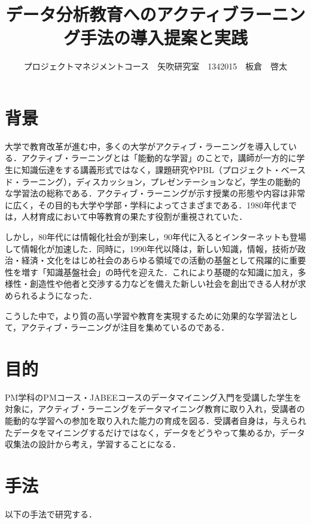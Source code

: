 \documentclass[uplatex,twocolumn,dvipdfmx]{jsarticle}
\title{\vspace{-5mm}\fontsize{14pt}{0pt}\selectfont  データ分析教育へのアクティブラーニング手法の導入提案と実践}
\author{\normalsize プロジェクトマネジメントコース　矢吹研究室　1342015　板倉　啓太}
\date{}
\begin{document}
\fontsize{10.5pt}{\baselineskip}\selectfont
\maketitle




\section{背景}

大学で教育改革が進む中，多くの大学がアクティブ・ラーニングを導入している．アクティブ・ラーニングとは「能動的な学習」のことで，講師が一方的に学生に知識伝達をする講義形式ではなく，課題研究やPBL（プロジェクト・ベースド・ラーニング），ディスカッション，プレゼンテーションなど，学生の能動的な学習法の総称である．アクティブ・ラーニングが示す授業の形態や内容は非常に広く，その目的も大学や学部・学科によってさまざまである．1980年代までは，人材育成において中等教育の果たす役割が重視されていた．

しかし，80年代には情報化社会が到来し，90年代に入るとインターネットも登場して情報化が加速した\cite{a}．同時に，1990年代以降は，新しい知識，情報，技術が政治・経済・文化をはじめ社会のあらゆる領域での活動の基盤として飛躍的に重要性を増す「知識基盤社会」の時代を迎えた．これにより基礎的な知識に加え，多様性・創造性や他者と交渉する力などを備えた新しい社会を創出できる人材が求められるようになった．

こうした中で，より質の高い学習や教育を実現するために効果的な学習法として，アクティブ・ラーニングが注目を集めているのである．




\section{目的}

PM学科のPMコース・JABEEコースのデータマイニング入門を受講した学生を対象に，アクティブ・ラーニングをデータマイニング教育に取り入れ，受講者の能動的な学習への参加を取り入れた能力の育成を図る．受講者自身は，与えられたデータをマイニングするだけではなく，データをどうやって集めるか，データ収集法の設計から考え，学習することになる\cite{b}．



\section{手法}

以下の手法で研究する．
\end{document}
